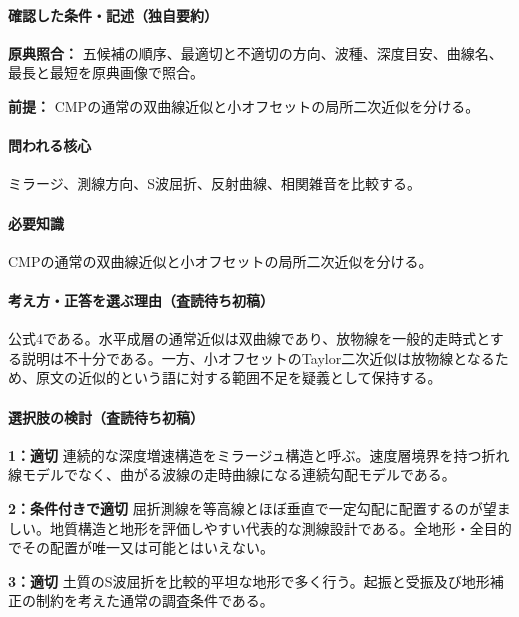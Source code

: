 \paragraph{確認した条件・記述（独自要約）}\mbox{}\par

\noindent\textbf{原典照合：} 五候補の順序、最適切と不適切の方向、波種、深度目安、曲線名、最長と最短を原典画像で照合。\par

\noindent\textbf{前提：} CMPの通常の双曲線近似と小オフセットの局所二次近似を分ける。\par

\paragraph{問われる核心} ミラージ、測線方向、S波屈折、反射曲線、相関雑音を比較する。

\paragraph{必要知識} CMPの通常の双曲線近似と小オフセットの局所二次近似を分ける。

\paragraph{考え方・正答を選ぶ理由（査読待ち初稿）} 公式4である。水平成層の通常近似は双曲線であり、放物線を一般的走時式とする説明は不十分である。一方、小オフセットのTaylor二次近似は放物線となるため、原文の近似的という語に対する範囲不足を疑義として保持する。

\paragraph{選択肢の検討（査読待ち初稿）}\mbox{}\par

\noindent\textbf{1：適切} 連続的な深度増速構造をミラージュ構造と呼ぶ。速度層境界を持つ折れ線モデルでなく、曲がる波線の走時曲線になる連続勾配モデルである。\par

\noindent\textbf{2：条件付きで適切} 屈折測線を等高線とほぼ垂直で一定勾配に配置するのが望ましい。地質構造と地形を評価しやすい代表的な測線設計である。全地形・全目的でその配置が唯一又は可能とはいえない。\par

\noindent\textbf{3：適切} 土質のS波屈折を比較的平坦な地形で多く行う。起振と受振及び地形補正の制約を考えた通常の調査条件である。\par

